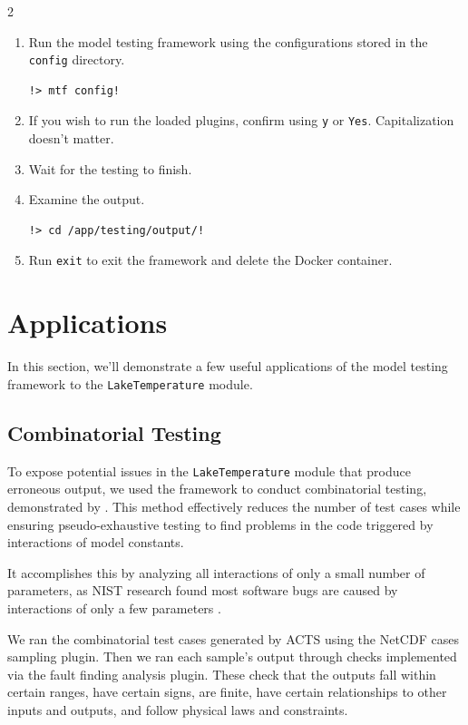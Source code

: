 \documentclass[10pt]{article}
\begin{document}
\begin{multicols}{2}
\begin{enumerate}
    \item Run the model testing framework using the configurations stored in the \verb|config| directory.
\begin{lstlisting}[style=dawn]
!> mtf config!
\end{lstlisting}

    \item If you wish to run the loaded plugins, confirm using \verb|y| or \verb|Yes|. Capitalization doesn't matter. 
    
    \item Wait for the testing to finish. 
    
    \item Examine the output.
\begin{lstlisting}[style=dawn]
!> cd /app/testing/output/!
\end{lstlisting}

    \item Run \verb|exit| to exit the framework and delete the Docker container. 
\end{enumerate}

\section{Applications}
In this section, we'll demonstrate a few useful applications of the model testing framework to the \verb|LakeTemperature| module. 

\subsection{Combinatorial Testing}
To expose potential issues in the \verb|LakeTemperature| module that produce erroneous output, we used the framework to conduct combinatorial testing, demonstrated by . This method effectively reduces the number of test cases while ensuring pseudo-exhaustive testing to find problems in the code triggered by interactions of model constants. 

It accomplishes this by analyzing all interactions of only a small number of parameters, as NIST research found most software bugs are caused by interactions of only a few parameters \cite{ACTS}. 

We ran the combinatorial test cases generated by ACTS \cite{ACTS} using the NetCDF cases sampling plugin. Then we ran each sample's output through checks implemented via the fault finding analysis plugin. These check that the outputs fall within certain ranges, have certain signs, are finite, have certain relationships to other inputs and outputs, and follow physical laws and constraints. 


\end{multicols}
\end{document}
